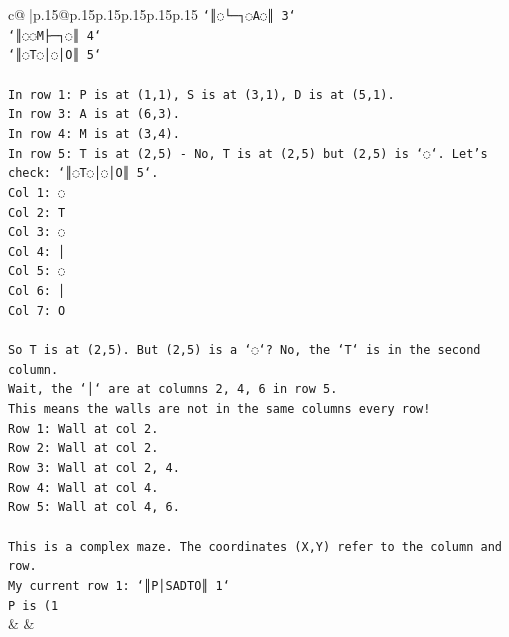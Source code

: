 \documentclass{article}
\begin{document}
{\begin{supertabular}{c@{$\;$}|p{.15\linewidth}@{}p{.15\linewidth}p{.15\linewidth}p{.15\linewidth}p{.15\linewidth}p{.15\linewidth}}
{{{\texttt{`║◌└─┐◌A◌║ 3`} \\
\texttt{`║◌◌M├─┐◌║ 4`} \\
\texttt{`║◌T◌│◌│O║ 5`} \\
\\ 
\texttt{In row 1: P is at (1,1), S is at (3,1), D is at (5,1).} \\
\texttt{In row 3: A is at (6,3).} \\
\texttt{In row 4: M is at (3,4).} \\
\texttt{In row 5: T is at (2,5) {-} No, T is at (2,5) but (2,5) is `◌`. Let's check: `║◌T◌│◌│O║ 5`.} \\
\texttt{Col 1: ◌} \\
\texttt{Col 2: T} \\
\texttt{Col 3: ◌} \\
\texttt{Col 4: │} \\
\texttt{Col 5: ◌} \\
\texttt{Col 6: │} \\
\texttt{Col 7: O} \\
\\ 
\texttt{So T is at (2,5). But (2,5) is a `◌`? No, the `T` is in the second column.} \\
\texttt{Wait, the `│` are at columns 2, 4, 6 in row 5.} \\
\texttt{This means the walls are not in the same columns every row!} \\
\texttt{Row 1: Wall at col 2.} \\
\texttt{Row 2: Wall at col 2.} \\
\texttt{Row 3: Wall at col 2, 4.} \\
\texttt{Row 4: Wall at col 4.} \\
\texttt{Row 5: Wall at col 4, 6.} \\
\\ 
\texttt{This is a complex maze. The coordinates (X,Y) refer to the column and row.} \\
\texttt{My current row 1: `║P│SADTO║ 1`} \\
\texttt{P is (1} \\
            }
        }
    }
    & & \\ \\


\end{supertabular}}
\end{document}
